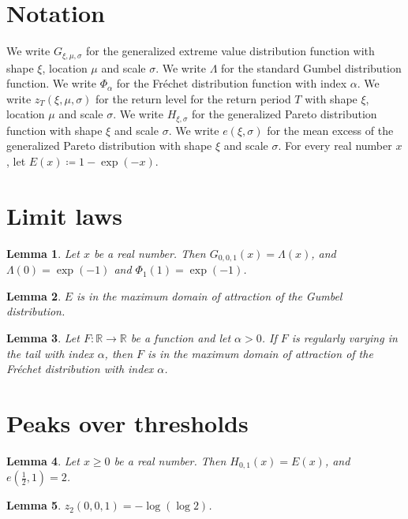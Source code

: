 \documentclass{article}
\newtheorem{lemma}{Lemma}
\begin{document}
\section{Notation}

We write $G_{\xi,\mu,\sigma}$ for the generalized extreme value distribution function with shape $\xi$, location $\mu$ and scale $\sigma$.
We write $\Lambda$ for the standard Gumbel distribution function.
We write $\Phi_\alpha$ for the Fréchet distribution function with index $\alpha$.
We write $z_T(\xi,\mu,\sigma)$ for the return level for the return period $T$ with shape $\xi$, location $\mu$ and scale $\sigma$.
We write $H_{\xi,\sigma}$ for the generalized Pareto distribution function with shape $\xi$ and scale $\sigma$.
We write $e(\xi,\sigma)$ for the mean excess of the generalized Pareto distribution with shape $\xi$ and scale $\sigma$.
For every real number $x$, let $E(x)\coloneqq 1-\exp(-x)$.

\section{Limit laws}

\begin{lemma}\label{gumbel}
Let $x$ be a real number. Then $G_{0,0,1}(x)=\Lambda(x)$, and $\Lambda(0)=\exp(-1)$ and $\Phi_1(1)=\exp(-1)$.
\end{lemma}

\begin{lemma}\label{exponential}
$E$ is in the maximum domain of attraction of the Gumbel distribution.
\end{lemma}

\begin{lemma}\label{frechet}
Let $F:\mathbb{R}\to\mathbb{R}$ be a function and let $\alpha>0$. If $F$ is regularly varying in the tail with index $\alpha$, then $F$ is in the maximum domain of attraction of the Fréchet distribution with index $\alpha$.
\end{lemma}

\section{Peaks over thresholds}

\begin{lemma}\label{pareto}
Let $x\ge0$ be a real number. Then $H_{0,1}(x)=E(x)$, and $e(\frac12,1)=2$.
\end{lemma}

\begin{lemma}\label{return}
$z_2(0,0,1)=-\log(\log 2)$.
\end{lemma}
\end{document}
